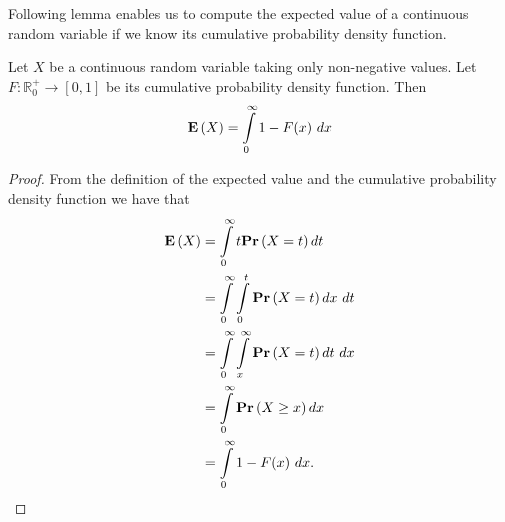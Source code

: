 Following lemma enables us to compute the expected value of a continuous random variable if we know its cumulative probability density function.
\begin{lemma}
\label{lemma-expected-value-cumulative}
Let $X$ be a continuous random variable taking only non-negative values. Let $F: \mathbb{R}_{0}^{+} \rightarrow \left[0, 1\right]$ be its cumulative probability density function. Then
\[
	\Expect{X} = \int\limits_{0}^{\infty} 1 - F(x) \ dx
\]
\end{lemma}
\begin{proof}
From the definition of the expected value and the cumulative probability density function we have that
\[
\begin{split}
\mathbf{E}\left(X\right) 
	& = \int\limits_{0}^{\infty} t\mathbf{Pr}\left(X = t\right) dt \\
	& = \int\limits_{0}^{\infty} \int\limits_{0}^{t} \mathbf{Pr}\left(X = t\right) dx \  dt \\
	& = \int\limits_{0}^{\infty} \int\limits_{x}^{\infty} \mathbf{Pr}\left(X = t\right) dt \  dx \\
	& = \int\limits_{0}^{\infty} \mathbf{Pr}\left(X \geq x\right) dx \\
	& = \int\limits_{0}^{\infty} 1 - F(x) \ dx \text{.}
\end{split}
\]
\end{proof}
